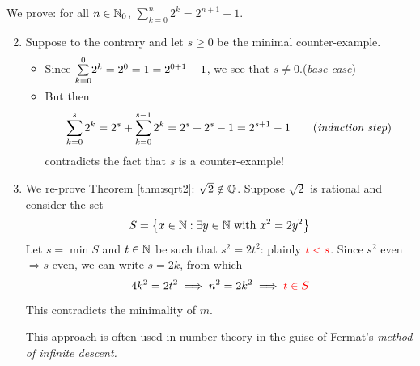 \begin{examples}{}{}
	\exstart We prove: for all $n\in\mathbb{N}_0$, $\sum\limits_{k=0}^n 2^k=2^{n+1}-1$.\vspace{-10pt}
	
	\begin{enumerate}\setcounter{enumi}{1}
	  \item[]Suppose to the contrary and let $s\ge 0$ be the minimal counter-example.
	  \begin{itemize}
	    \item Since $\smash{\sum\limits_{k=0}^0} 2^k=2^0=1=2^{0+1}-1$, we see that $s\neq 0$.\hfill (\emph{base case})
	    \item But then
	    \[
	    	\sum\limits_{k=0}^s2^k=2^s+\sum\limits_{k=0}^{s-1} 2^k =2^s+2^s-1=2^{s+1}-1 \tag{\emph{induction step}}
	    \]
	    contradicts the fact that $s$ is a counter-example!
	  \end{itemize} 
	  
	  
	  \item We re-prove Theorem \ref{thm:sqrt2}: $\sqrt 2\notin\mathbb{Q}$. Suppose $\sqrt 2$ is rational and consider the set
	  \[
	  	S=\bigl\{x\in\mathbb{N}:\exists y\in \mathbb{N}\text{ with }x^2=2y^2\bigr\}
	  \]
	  Let $s=\min S$ and $t\in\mathbb{N}$ be such that $s^2=2t^2$: plainly $\textcolor{red}{t<s}$. Since $s^2$ even $\Longrightarrow s$ even, we can write $s=2k$, from which
	  \[
	  	4k^2=2t^2\implies n^2=2k^2\implies \textcolor{red}{t\in S}
	  \]
	  This contradicts the minimality of $m$.\par
	  This approach is often used in number theory in the guise of Fermat's \emph{method of infinite descent.}
	\end{enumerate}
\end{examples}




